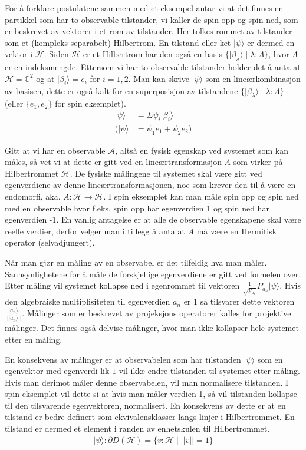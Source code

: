         For å forklare postulatene sammen med et eksempel antar vi at det finnes en partikkel som har to observable tilstander, vi kaller de spin opp og spin ned, som er beskrevet av vektorer i et rom av tilstander. Her tolkes rommet av tilstander som et (kompleks separabelt) Hilbertrom. En tilstand eller ket $|\psi\rangle$ er dermed en vektor i $\mathcal{H}$. Siden $\mathcal{H}$ er et Hilbertrom har den også en basis $\{|\beta_\lambda\rangle\mid\lambda : \Lambda\}$, hvor $\Lambda$ er en indeksmengde. Ettersom vi har to observable tilstander holder det å anta at $\mathcal{H}=\mathbb{C}^2$ og at $|\beta_i\rangle = e_i$ for $i=1,2$. Man kan skrive $|\psi\rangle$ som en lineærkombinasjon av basisen, dette er også kalt for en superposisjon av tilstandene $\{|\beta_\lambda\rangle\mid\lambda : \Lambda\}$ (eller $\{e_1, e_2\}$ for spin eksemplet).
        \begin{align*}
            |\psi\rangle & = \Sigma\psi_i|\beta_i\rangle \\
            (|\psi\rangle & = \psi_1e_1 + \psi_2e_2)
        \end{align*}

        Gitt at vi har en observable $\mathcal{A}$, altså en fysisk egenskap ved systemet som kan måles, så vet vi at dette er gitt ved en lineærtransformasjon $A$ som virker på Hilbertrommet $\mathcal{H}$. De fysiske målingene til systemet skal være gitt ved egenverdiene av denne lineærtransformasjonen, noe som krever den til å være en endomorfi, aka. $A:\mathcal{H}\rightarrow\mathcal{H}$. I spin eksemplet kan man måle spin opp og spin ned med en observable hvor f.eks. spin opp har egenverdien 1 og spin ned har egenverdien -1. En vanlig antagelse er at alle de observable egenskapene skal være reelle verdier, derfor velger man i tillegg å anta at $A$ må være en Hermitisk operator (selvadjungert).

        Når man gjør en måling av en observabel er det tilfeldig hva man måler. Sannsynlighetene for å måle de forskjellige egenverdiene er gitt ved formelen over. Etter måling vil systemet kollapse ned i egenrommet til vektoren $\frac{1}{\sqrt{p_{a_n}}}P_{a_n}|\psi\rangle$. Hvis den algebraiske multiplisiteten til egenverdien $a_n$ er $1$ så tilsvarer dette vektoren $\frac{|a_n\rangle}{|||a_n\rangle ||}$. Målinger som er beskrevet av projeksjons operatorer kalles for projektive målinger. Det finnes også delvise målinger, hvor man ikke kollapser hele systemet etter en måling.
        
        En konsekvens av målinger er at observabelen som har tilstanden $|\psi\rangle$ som en egenvektor med egenverdi lik $1$ vil ikke endre tilstanden til systemet etter måling. Hvis man derimot måler denne observabelen, vil man normalisere tilstanden. I spin eksemplet vil dette si at hvis man måler verdien 1, så vil tilstanden kollapse til den tilsvarende egenvektoren, normalisert. En konsekvens av dette er at en tilstand er bedre definert som ekvivalensklasser langs linjer i Hilbertrommet. En tilstand er dermed et element i randen av enhetskulen til Hilbertrommet.
        \begin{align*}
            |\psi\rangle : \partial D(\mathcal{H}) = \{v:\mathcal{H}\mid ||v||=1\}
        \end{align*}

